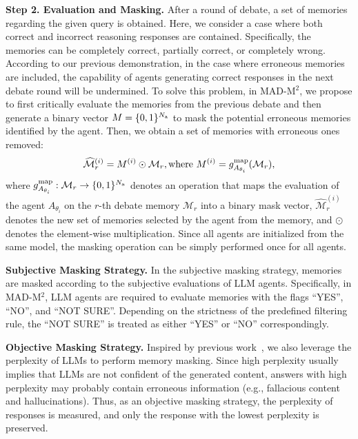 \documentclass{article} %
\newcommand{\methodname}{MAD-M$^2$}
\theoremstyle{plain}
\begin{document}
\textbf{Step 2. Evaluation and Masking.} After a round of debate, a set of memories regarding the given query is obtained. Here, we consider a case where both correct and incorrect reasoning responses are contained. Specifically, the memories can be completely correct, partially correct, or completely wrong. According to our previous demonstration, in the case where erroneous memories are included, the capability of agents generating correct responses in the next debate round will be undermined. To solve this problem, in \methodname, we propose to first critically evaluate the memories from the previous debate and then generate a binary vector $M=\{0, 1\}^{N_{\rm a}}$ to mask the potential erroneous memories identified by the agent. Then, we obtain a set of memories with erroneous ones removed:
\vspace{-2pt}
\begin{equation}
\label{eq:memory_masking}
    \widehat{\mathcal{M}}^{(i)}_r=M^{(i)}\odot\mathcal{M}_r, \text{where}\ M^{(i)}=g^{\rm map}_{A_{\theta_i}}(\mathcal{M}_r),
\vspace{-2pt}
\end{equation}
where $g^{\rm map}_{A_{\theta_i}}: \mathcal{M}_{r}\to\{0, 1\}^{N_{\rm a}}$ denotes an operation that maps the evaluation of the agent $A_{\theta_i}$ on the $r$-th debate memory $\mathcal{M}_r$ into a binary mask vector, $\widehat{\mathcal{M}}^{(i)}_r$ denotes the new set of memories selected by the agent from the memory, and $\odot$ denotes the element-wise multiplication. Since all agents are initialized from the same model, the masking operation can be simply performed once for all agents.

\textbf{Subjective Masking Strategy.} In the subjective masking strategy, memories are masked according to the subjective evaluations of LLM agents. Specifically, in \methodname, LLM agents are required to evaluate memories with the flags ``YES'', ``NO'', and ``NOT SURE''. Depending on the strictness of the predefined filtering rule, the ``NOT SURE'' is treated as either ``YES'' or ``NO'' correspondingly.

\textbf{Objective Masking Strategy.} Inspired by previous work~\citep{fu2025deep}, we also leverage the perplexity of LLMs to perform memory masking. Since high perplexity usually implies that LLMs are not confident of the generated content, answers with high perplexity may probably contain erroneous information (e.g., fallacious content and hallucinations). Thus, as an objective masking strategy, the perplexity of responses is measured, and only the response with the lowest perplexity is preserved.
\end{document}
